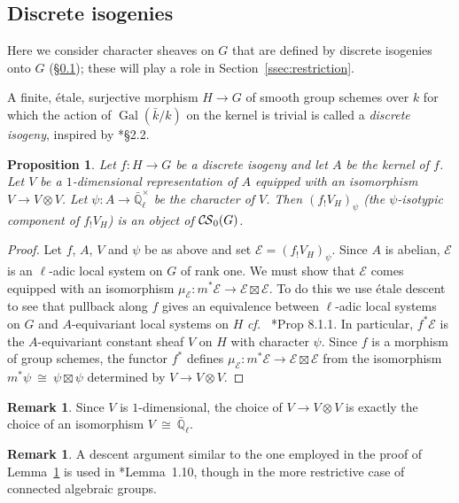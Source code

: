 \documentclass[10pt]{amsart}
\theoremstyle{plain}
\newtheorem{proposition}[theorem]{Proposition}
\theoremstyle{definition}
\newtheorem{remark}[theorem]{Remark}
\newcommand{\EE}{\mathbb{\bar Q}_\ell}
\newcommand{\bFq}{\bar{k}}
\newcommand{\Fq}{k}
\newcommand{\EEx}{\EE^\times}
\DeclareMathOperator{\Gal}{Gal}
\newcommand{\iso}{{\ \cong\ }}
\newcommand{\cs}[1]{{\mathcal{#1}}}
\newcommand{\CS}{{\mathcal{C\hskip-0.8pt S}}}
\newcommand{\bCS}{{\CS_0}}
\begin{document}
\subsection{Discrete isogenies}\label{ssec:discrete_isogenies}

Here we consider character sheaves on $G$ that are defined by discrete isogenies onto $G$
(\S \ref{ssec:discrete_isogenies}); these will play a role in Section~\ref{ssec:restriction}.

A finite, \'etale, surjective morphism $H\to G$ of smooth group schemes over $\Fq$ for which the action
of $\Gal(\bFq/\Fq)$ on the kernel is trivial is called a {\it discrete isogeny}, inspired by \cite{kamgarpour:09a}*{\S 2.2}.

\begin{proposition}\label{prop:finite}
Let $f: H \to G$ be a discrete isogeny and let $A$ be the kernel of $f$.
Let $V$ be a $1$-dimensional representation of $A$ 
equipped with an isomorphism $V\to V\otimes V$.
Let $\psi : A \to \EEx$ be the character of $V$.
Then $(f_! V_H)_\psi$ (the $\psi$-isotypic component of $f_!V_H$) is an object of $\bCS(G)$.
\end{proposition}

\begin{proof}
Let $f$, $A$, $V$ and $\psi$ be as above and set $\cs{E} = (f_! V_H)_\psi$.
Since $A$ is abelian, $\cs{E}$ is an $\ell$-adic local system on $G$ of rank one.
We must show that $\cs{E}$ comes equipped with an isomorphism $\mu_\cs{E} : m^* \cs{E} \to \cs{E}\boxtimes\cs{E}$.
To do this we use \'etale descent to see that pullback along $f$ gives an equivalence between $\ell$-adic local systems
on $G$ and $A$-equivariant local systems on $H$ {\it cf.\ } \cite{bernstein-luntz:equivariant_sheaves}*{Prop 8.1.1}. 
In particular, $f^*\cs{E}$ is the $A$-equivariant constant sheaf $V$ on $H$ with character $\psi$.
Since $f$ is a morphism of group schemes, the functor $f^*$ defines $\mu_\cs{E} : m^*\cs{E} \to \cs{E}\boxtimes\cs{E}$
from the isomorphism $m^*\psi \iso \psi \boxtimes\psi$ determined by $V\to V\otimes V$. 
\end{proof}

\begin{remark}
Since $V$ is $1$-dimensional, the choice of $V \to V\otimes V$ is exactly the choice of an isomorphism $V\iso \EE$.
\end{remark}

\begin{remark}
A descent argument similar to the one employed in the proof of Lemma~\ref{prop:finite} is used in
\cite{boyarchenko-drinfeld:10a}*{Lemma~1.10}, though in the more restrictive case of connected algebraic groups.
\end{remark}
\end{document}
